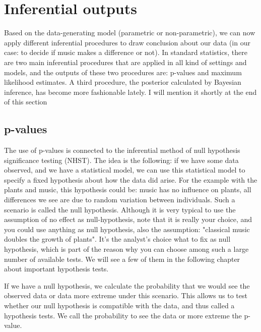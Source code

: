 \documentclass[a4paper,twoside]{tufte-book}\usepackage[]{graphicx}\usepackage[]{color}
\begin{document}
\section{Inferential outputs}

Based on the data-generating model (parametric or non-parametric), we can now apply different inferential procedures to draw conclusion about our data (in our case: to decide if music makes a difference or not). In standard statistics, there are two main inferential procedures that are applied in all kind of settings and models, and the outputs of these two procedures are: p-values and maximum likelihood estimates. A third procedure, the posterior calculated by Bayesian inference, has become more fashionable lately. I will mention it shortly at the end of this section 

\subsection{p-values}

The use of p-values is connected to the inferential method of null hypothesis significance testing (NHST). The idea is the following: if we have some data observed, and we have a statistical model, we can use this statistical model to specify a fixed hypothesis about how the data did arise. For the example with the plants and music, this hypothesis could be: music has no influence on plants, all differences we see are due to random variation between individuals. Such a scenario is called the null hypothesis.  Although it is very typical to use the assumption of no effect as null-hypothesis, note that it is really your choice, and you could use anything as null hypothesis, also the assumption: "classical music doubles the growth of plants". It's the analyst's choice what to fix as null hypothesis, which is part of the reason why you can choose among such a large number of available tests. We will see a few of them in the following chapter about important hypothesis tests.

If we have a null hypothesis, we calculate the probability that we would see the observed data or data more extreme under this scenario. This allows us to test whether our null hypothesis is compatible with the data, and thus called a hypothesis tests. We call the probability to see the data or more extreme the p-value.  
\end{document}

